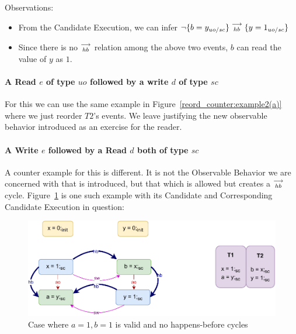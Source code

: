         Observations:
        \begin{itemize}
            \item From the Candidate Execution, we can infer $\neg\{b=y_{uo/sc}\}\stackrel{\longrightarrow}{_{hb}}\{y=1_{uo/sc}\}$
            \item Since there is no $\stackrel{\longrightarrow}{_{hb}}$ relation among the above two events, $b$ can read the value of $y$ as $1$.
        \end{itemize}

    \paragraph{A Read $e$ of type $uo$ followed by a write $d$ of type $sc$}

        For this we can use the same example in Figure~\ref{reord_counter:example2(a)} where we just reorder $T2$'s events.
        We leave justifying the new observable behavior introduced as an exercise for the reader.
    
        
    \paragraph{A Write $e$ followed by a Read $d$ both of type $sc$}
        
        A counter example for this is different. 
        It is not the Observable Behavior we are concerned with that is introduced, but that which is allowed but creates a $\stackrel{\longrightarrow}{_{hb}}$ cycle. 
        Figure~\ref{reord_counter:example3(a)} is one such example with its Candidate and Corresponding Candidate Execution in question:
        \begin{figure}[H]
            \centering
            \includegraphics[scale=0.7]{7.CounterExamples/ReorderingCandidate/Example5(Wsc-Rsc).pdf}
            \caption{Case where $a = 1, b = 1$ is valid and no happens-before cycles}
            \label{reord_counter:example3(a)}
        \end{figure}

